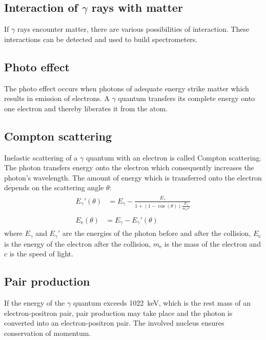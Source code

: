 \subsection{Interaction of $\gamma$ rays with matter}
If $\gamma$ rays encounter matter, there are various possibilities of interaction. These interactions can be detected and used to build spectrometers.
%
\subsection{Photo effect}
The photo effect occurs when photons of adequate energy strike matter which results in emission of electrons.
A $\gamma$ quantum transfers its complete energy onto one electron and thereby liberates it from the atom.
%
\subsection{Compton scattering}
Inelastic scattering of a $\gamma$ quantum with an electron is called Compton scattering.
The photon transfers energy onto the electron which consequently increases the photon's wavelength.
The amount of energy which is transferred onto the electron depends on the scattering angle $\theta$:
\begin{align}
    \label{eq:PhotonNachStoss}
    \begin{split}
        {E_{\gamma}}'(\theta) &= E_{\gamma} - \frac{E_{\gamma}}{1 + \left ( 1 - \cos(\theta) \right ) \frac{E_{\gamma}}{m_{\text{e}} c^2}}
    \end{split}
    \\
    \label{eq:ElektronNachStoss}
    \begin{split}
        E_{\text{e}}(\theta) &= E_{\gamma} - {E_{\gamma}}'(\theta)
    \end{split}
\end{align}
where $E_{\gamma}$ and ${E_{\gamma}}'$ are the energies of the photon before and after the collision, $E_{\text{e}}$ is the energy of the electron after the collision, $m_{\text{e}}$ is the mass of the electron and $c$ is the speed of light. \cite{AnleitungZusatz2}
%
\subsection{Pair production}
If the energy of the $\gamma$ quantum exceeds \SI{1022}{\kilo\electronvolt}, which is the rest mass of an electron-positron pair, pair production may take place and the photon is converted into an electron-positron pair.
The involved nucleus ensures conservation of momentum.
\cite{AnleitungZusatz1}
%
